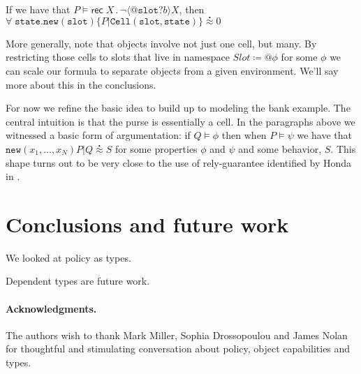 \documentclass[]{amsart}
\makeatletter
\newcommand{\id}[1]{\texttt{#1}}
\newcommand{\juxtap}{\mathbin{\id{|}}}
\newcommand{\binpar}[2]{#1 \juxtap #2}
\newcommand{\quotep}[1]{@#1}
\newcommand{\defneqls}{\coloneqq}
\newcommand{\wbbisim}{\stackrel{\centerdot}{\approx}} %
\newcommand{\pprefix}[3]{\langle #1 ? #2 \rangle #3}
\newcommand{\pgfp}[2]{\textsf{rec} \; #1 \mathbin{.} #2}
\theoremstyle{definition}
\theoremstyle{remark}
\numberwithin{equation}{subsection}
\makeatother
\begin{document}
If we have that $P \models \pgfp{X}{\neg
  \pprefix{\quotep{\texttt{slot}}}{b}{X}}$, then
$\forall \; \texttt{state}.\texttt{new}(\texttt{slot})\{\binpar{P}{\texttt{Cell}(\texttt{slot},\texttt{state})\}}
\wbbisim 0$

More generally, note that objects involve not just one cell, but
many. By restricting those cells to slots that live in namespace $Slot
\defneqls {@}\phi$ for some $\phi$ we can scale our formula to
separate objects from a given environment. We'll say more about this
in the conclusions. 

For now we refine the basic idea to build up to modeling the bank
example. The central intuition is that the purse is essentially a
cell. In the paragraphs above we witnessed a basic form of argumentation: if $Q
\models \phi$ then when $P \models \psi$ we have that
$\texttt{new}(x_1,\ldots,x_N)\binpar{P}{Q} \wbbisim S$ for some properties
$\phi$ and $\psi$ and some behavior, $S$. This shape turns out to be
very close to the use of rely-guarantee identified by Honda in
\cite{HondoRG}.

\section{Conclusions and future work}

We looked at policy as types.

Dependent types are future work.

\paragraph{Acknowledgments.}
The authors wish to thank Mark Miller, Sophia Drossopoulou and James Nolan for
thoughtful and stimulating conversation about policy, object
capabilities and types.





\end{document}
